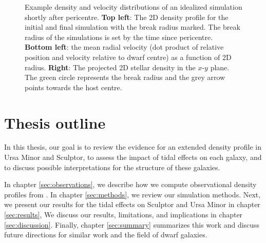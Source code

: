 \begin{figure}
\centering
{}
\caption[Break radius validation]{Example density and velocity
distributions of an idealized simulation shortly after pericentre.
\textbf{Top left}: The 2D density profile for the initial and final
simulation with the break radius marked. The break radius of the
simulations is set by the time since pericentre. \textbf{Bottom left}:
the mean radial velocity (dot product of relative position and velocity
relative to dwarf centre) as a function of 2D radius. \textbf{Right}:
The projected 2D stellar density in the \(x\)-\(y\) plane. The green
circle represents the break radius and the grey arrow points towards the
host centre.}\label{fig:idealized_break_radius}
\end{figure}

\section{Thesis outline}\label{thesis-outline}

In this thesis, our goal is to review the evidence for an extended
density profile in Ursa Minor and Sculptor, to assess the impact of
tidal effects on each galaxy, and to discuss possible interpretations
for the structure of these galaxies.

In chapter \ref{sec:observations}, we describe how we compute
observational density profiles from \citet{jensen+2024}. In chapter
\ref{sec:methods}, we review our simulation methods. Next, we present
our results for the tidal effects on Sculptor and Ursa Minor in chapter
\ref{sec:results}, We discuss our results, limitations, and implications
in chapter \ref{sec:discussion}. Finally, chapter \ref{sec:summary}
summarizes this work and discuss future directions for similar work and
the field of dwarf galaxies.
